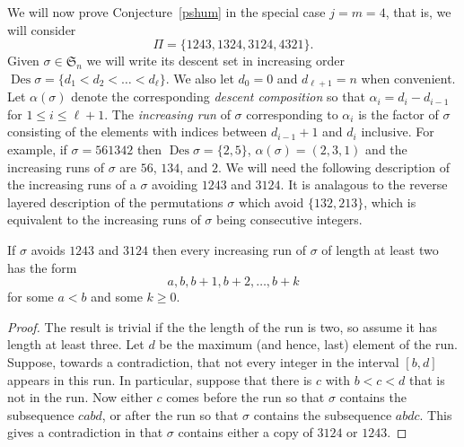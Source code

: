 \documentclass[ALCO,ThmDefs,Unicode,epreuves]{cedram}
\newcommand{\al}{\alpha}
\newcommand{\si}{\sigma}
\newcommand{\fS}{{\mathfrak S}}
\DeclareMathOperator{\Des}{Des}
\begin{document}
We will now prove Conjecture~\ref{pshum} in the special case $j=m=4$, that is, we will consider 
\begin{equation}
\label{124pshu3,4321}
\Pi=\{1243, 1324, 3124, 4321\}.
\end{equation}
Given $\si\in\fS_n$ we will write its descent set in increasing order $\Des\si=\{d_1<d_2<\dots<d_\ell\}$. We also let $d_0=0$ and $d_{\ell+1}=n$ when convenient. Let $\al(\si)$ denote the corresponding \emph{descent composition} so that $\al_i = d_i-d_{i-1}$ for $1\le i \le \ell+1$. The {\em increasing run} of $\si$ corresponding to $\al_i$ is the factor of $\si$ consisting of the elements with indices between $d_{i-1}+1$ and $d_i$ inclusive. For example, if $\si=561342$ then $\Des\si=\{2,5\}$, $\al(\si)=(2,3,1)$ and the increasing runs of $\si$ are $56$, $134$, and $2$. We will need the following description of the increasing runs of a $\si$ avoiding $1243$ and $3124$. It is analagous to the reverse layered description of the permutations $\si$ which avoid $\{132,213\}$, which is equivalent to the increasing runs of $\si$ being consecutive integers.
\begin{lemma}
\label{run}
If $\si$ avoids $1243$ and $3124$ then every increasing run of $\si$ of length at least two has the form
\[
a,b,b+1,b+2,\dots,b+k
\]
for some $a<b$ and some $k\ge0$.
\end{lemma}
\begin{proof}
The result is trivial if the the length of the run is two, so assume it has length at least three. Let $d$ be the maximum (and hence, last) element of the run. Suppose, towards a contradiction, that not every integer in the interval $[b,d]$ appears in this run. In particular, suppose that there is $c$ with $b<c<d$ that is not in the run. Now either $c$ comes before the run so that $\si$ contains the subsequence $cabd$, or after the run so that $\si$ contains the subsequence $abdc$. This
gives a contradiction in that $\si$ contains either a copy of $3124$ or $1243$.
\end{proof}
\end{document}

